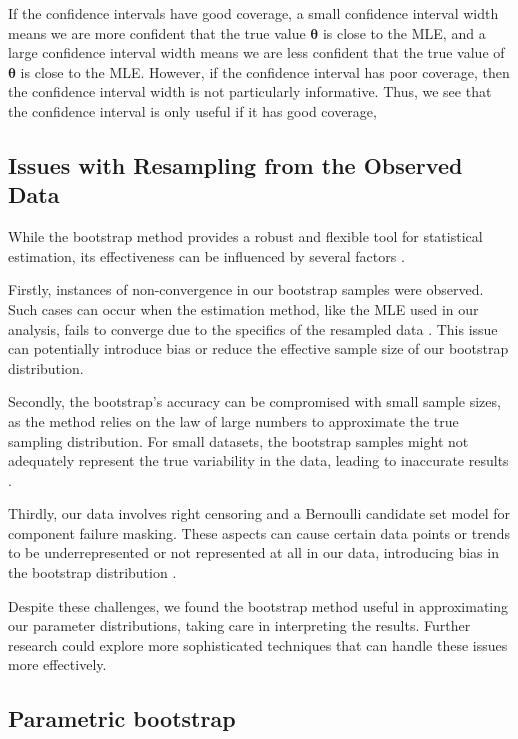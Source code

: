\documentclass[
]{article}
\begin{document}
If the confidence intervals have good coverage, a small confidence
interval width means we are more confident that the true value
\(\boldsymbol{\theta}\) is close to the MLE, and a large confidence
interval width means we are less confident that the true value of
\(\boldsymbol{\theta}\) is close to the MLE. However, if the confidence
interval has poor coverage, then the confidence interval width is not
particularly informative. Thus, we see that the confidence interval is
only useful if it has good coverage,

\hypertarget{issues-with-resampling-from-the-observed-data}{%
\subsection{Issues with Resampling from the Observed
Data}\label{issues-with-resampling-from-the-observed-data}}

While the bootstrap method provides a robust and flexible tool for
statistical estimation, its effectiveness can be influenced by several
factors \citep{efron1994introduction}.

Firstly, instances of non-convergence in our bootstrap samples were
observed. Such cases can occur when the estimation method, like the MLE
used in our analysis, fails to converge due to the specifics of the
resampled data \citep{casella2002statistical}. This issue can
potentially introduce bias or reduce the effective sample size of our
bootstrap distribution.

Secondly, the bootstrap's accuracy can be compromised with small sample
sizes, as the method relies on the law of large numbers to approximate
the true sampling distribution. For small datasets, the bootstrap
samples might not adequately represent the true variability in the data,
leading to inaccurate results \citep{efron1994introduction}.

Thirdly, our data involves right censoring and a Bernoulli candidate set
model for component failure masking. These aspects can cause certain
data points or trends to be underrepresented or not represented at all
in our data, introducing bias in the bootstrap distribution
\citep{klein2005survival}.

Despite these challenges, we found the bootstrap method useful in
approximating our parameter distributions, taking care in interpreting
the results. Further research could explore more sophisticated
techniques that can handle these issues more effectively.

\hypertarget{parametric-bootstrap}{%
\subsection*{Parametric bootstrap}\label{parametric-bootstrap}}
\end{document}
